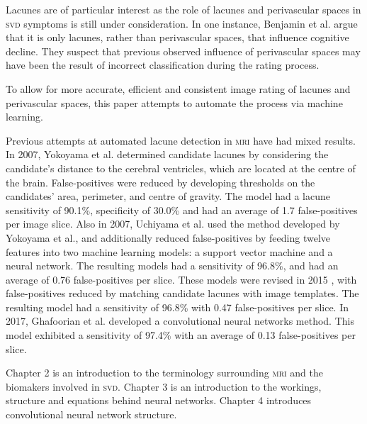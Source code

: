Lacunes are of particular interest as the role of lacunes and perivascular spaces in \textsc{svd} symptoms is still under consideration. In one instance, Benjamin et al. \cite{BenjaminJ.Philip2018LIbN} argue that it is only lacunes, rather than perivascular spaces, that influence cognitive decline. They suspect that previous observed influence of perivascular spaces may have been the result of incorrect classification during the rating process.

To allow for more accurate, efficient and consistent image rating of lacunes and perivascular spaces, this paper attempts to automate the process via machine learning.

Previous attempts at automated lacune detection in \textsc{mri} have had mixed results. In 2007, Yokoyama et al. \cite{Yokoyama2007} determined candidate lacunes by considering the candidate's distance to the cerebral ventricles, which are located at the centre of the brain. False-positives were reduced by developing thresholds on the candidates' area, perimeter, and centre of gravity. The model had a lacune sensitivity of 90.1\%, specificity of 30.0\% and had an average of 1.7 false-positives per image slice. Also in 2007, Uchiyama et al. \cite{Uchiyama2007b, Uchiyama20071554} used the method developed by Yokoyama et al., and additionally reduced false-positives by feeding twelve features into two machine learning models: a support vector machine and a neural network. The resulting models had a sensitivity of 96.8\%, and had an average of 0.76 false-positives per slice. These models were revised in 2015 \cite{Uchiyama2015}, with false-positives reduced by matching candidate lacunes with image templates. The resulting model had a sensitivity of 96.8\% with 0.47 false-positives per slice. In 2017, Ghafoorian et al. \cite{GhafoorianM.2017Dml3} developed a convolutional neural networks method. This model exhibited a sensitivity of 97.4\% with an average of 0.13 false-positives per slice.

Chapter 2 is an introduction to the terminology surrounding \textsc{mri} and the biomakers involved in \textsc{svd}. Chapter 3 is an introduction to the workings, structure and equations behind neural networks. Chapter 4 introduces convolutional neural network structure.

%
%
%





